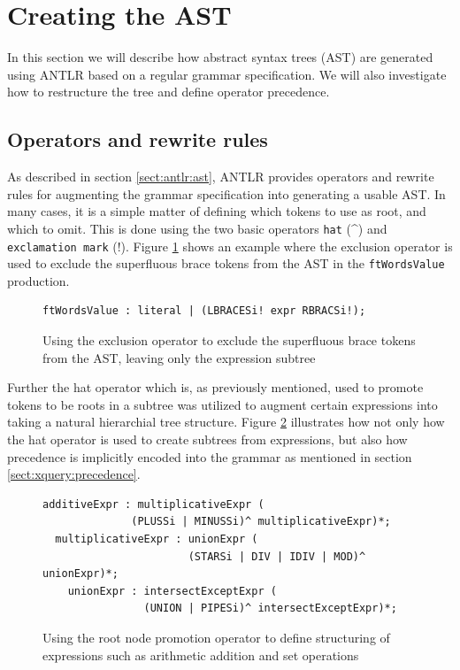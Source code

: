 \section{Creating the AST}
\label{sect:impl:ast}
In this section we will describe how abstract syntax trees (AST) are generated 
using ANTLR based on a regular grammar specification. We will also investigate
how to restructure the tree and define operator precedence.

\subsection{Operators and rewrite rules}
As described in section \ref{sect:antlr:ast}, ANTLR provides operators and
rewrite rules for augmenting the grammar specification into generating a usable
AST. In many cases, it is a simple matter of defining which tokens to use as
root, and which to omit. This is done using the two basic operators \verb!hat!
(\^{}) and \verb!exclamation mark! (!). Figure \ref{code:ast:exoperator} shows an
example where the exclusion operator is used to exclude the superfluous brace
tokens from the AST in the \verb!ftWordsValue! production.

\begin{figure}[h!]
\begin{verbatim}
ftWordsValue : literal | (LBRACESi! expr RBRACSi!);
\end{verbatim}
\caption[AST exclusion operator example]{Using the exclusion operator to exclude
the superfluous brace tokens from the AST, leaving only the expression subtree}
\label{code:ast:exoperator}
\end{figure}

Further the hat operator which is, as previously mentioned, used to promote
tokens to be roots in a subtree was utilized to augment certain expressions into
taking a natural hierarchial tree structure. Figure \ref{code:ast:hatoperator}
illustrates how not only how the hat operator is used to create subtrees from
expressions, but also how precedence is implicitly encoded into the grammar as
mentioned in section \ref{sect:xquery:precedence}.

\begin{figure}[h!]
\begin{verbatim}
additiveExpr : multiplicativeExpr (
              (PLUSSi | MINUSSi)^ multiplicativeExpr)*;
  multiplicativeExpr : unionExpr (
                       (STARSi | DIV | IDIV | MOD)^ unionExpr)*;
    unionExpr : intersectExceptExpr (
                (UNION | PIPESi)^ intersectExceptExpr)*;
\end{verbatim}
\caption[AST root node promotion operator example]{Using the root node promotion
operator to define structuring of expressions such as arithmetic addition and set
operations}
\label{code:ast:hatoperator}
\end{figure}

